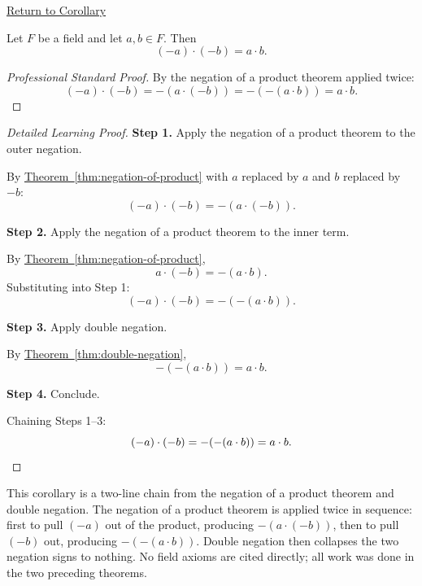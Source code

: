 \newpage
{}
\label{prf:product-of-negatives}

\begin{remark*}[Return]
\hyperref[cor:product-of-negatives]{Return to Corollary}
\end{remark*}

\begin{corollary*}
Let $F$ be a field and let $a,b\in F$.  Then
\[
(-a)\cdot(-b) = a\cdot b.
\]
\end{corollary*}

\begin{proof}[Professional Standard Proof]
\LRAProofBodyStart
By the negation of a product theorem applied twice:
\[
(-a)\cdot(-b) = -(a\cdot(-b)) = -(-(a\cdot b)) = a\cdot b.
\]
\end{proof}

\begin{proof}[Detailed Learning Proof]
\LRAProofBodyStart

\textbf{Step 1.} Apply the negation of a product theorem to the outer negation.

By \hyperref[thm:negation-of-product]{Theorem~\ref*{thm:negation-of-product}}
with $a$ replaced by $a$ and $b$ replaced by $-b$:
\[
(-a)\cdot(-b) = -(a\cdot(-b)).
\]

\textbf{Step 2.} Apply the negation of a product theorem to the inner term.

By \hyperref[thm:negation-of-product]{Theorem~\ref*{thm:negation-of-product}},
\[
a\cdot(-b) = -(a\cdot b).
\]
Substituting into Step 1:
\[
(-a)\cdot(-b) = -(-(a\cdot b)).
\]

\textbf{Step 3.} Apply double negation.

By \hyperref[thm:double-negation]{Theorem~\ref*{thm:double-negation}},
\[
-(-(a\cdot b)) = a\cdot b.
\]

\textbf{Step 4.} Conclude.

Chaining Steps 1--3:
\[
(-a)\cdot(-b) = -(-(a\cdot b)) = a\cdot b. \qedhere
\]
\end{proof}

\begin{remark*}
This corollary is a two-line chain from the negation of a product theorem
and double negation.  The negation of a product theorem is applied twice in
sequence: first to pull $(-a)$ out of the product, producing $-(a\cdot(-b))$,
then to pull $(-b)$ out, producing $-(-(a\cdot b))$.  Double negation then
collapses the two negation signs to nothing.  No field axioms are cited
directly; all work was done in the two preceding theorems.
\end{remark*}

